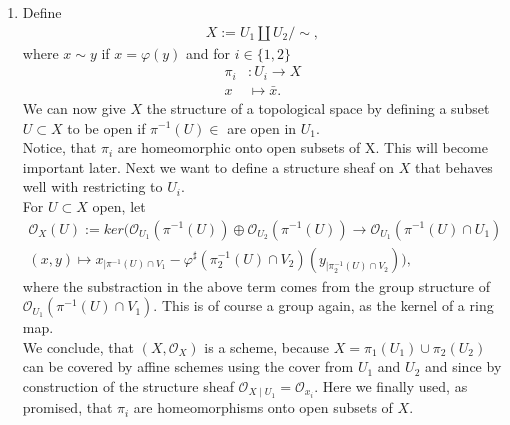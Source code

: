 \begin{exercise}{1}
    \begin{enumerate}
        \item Define 
        \begin{align*}
            X:=U_1\coprod U_2/\!{\sim},
        \end{align*}
        where $x\sim y$ if $x=\varphi(y)$ and for $i\in \lbrace
        1,2\rbrace$
        \begin{align*}
            \pi_i&:U_i\to X\\
            x&\mapsto \bar{x}.
        \end{align*}
        We can now give $X$ the structure of a topological 
        space by defining a subset $U\subset X$ to be open
        if $\pi^{-1}(U)\in$ are open in $U_1$.\\
        Notice, that $\pi_i$ are homeomorphic onto open subsets
        of X. This will become important later.
        Next we want to define a structure sheaf on $X$ that
        behaves well with restricting to $U_i.$\\
        For $U\subset X$ open, let 
        \begin{align*}
            \mathcal{O}_X(U):=ker(\mathcal{O}_{U_1}(\pi^{-1}(U))\oplus \mathcal{O}_{U_2}(\pi^{-1}(U)) \to \mathcal{O}_{U_1}(\pi^{-1}(U) \cap U_1)\\
            (x,y) \mapsto x_{\mid \pi^{-1}(U)\cap V_1}-\varphi^\sharp (\pi_2^{-1}(U)\cap V_2)(y_{\mid \pi_2^{-1}(U)\cap V_2})),
        \end{align*}
            where the substraction in the above term comes from the group
            structure of $\mathcal{O}_{U_1}(\pi^{-1}(U)\cap V_1)$. This is of course
            a group again, as the kernel of a ring map.\\
            We conclude, that $(X,\mathcal{O}_X)$ is a scheme, because 
            $X=\pi_1(U_1)\cup \pi _2(U_2)$  can be covered by affine
            schemes using the cover from $U_1$ and $U_2$ and since by construction
            of the structure sheaf $\mathcal{O}_{X \mid U_1}=\mathcal{O}_{x_i}.$
            Here we finally used, as promised, that $\pi_i$ are homeomorphisms
            onto open subsets of $X$.
    \end{enumerate}
\end{exercise}
